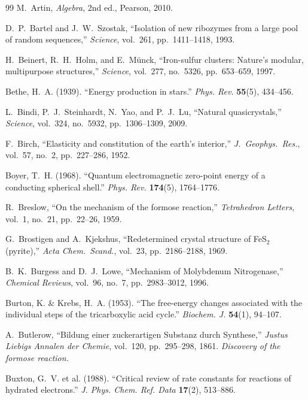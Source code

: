 \documentclass[12pt,oneside]{book}
\begin{document}
\vspace{2em}
\begin{thebibliography}{99}
M.~Artin,
\emph{Algebra},
2nd ed., Pearson, 2010.

D.~P.~Bartel and J.~W.~Szostak,
``Isolation of new ribozymes from a large pool of random sequences,''
\emph{Science}, vol.~261, pp.~1411--1418, 1993.

H.~Beinert, R.~H.~Holm, and E.~M\"unck,
``Iron-sulfur clusters: Nature's modular, multipurpose structures,''
\emph{Science}, vol.~277, no.~5326, pp.~653--659, 1997.

Bethe, H.~A. (1939).
``Energy production in stars.''
\textit{Phys. Rev.} \textbf{55}(5), 434--456.

L.~Bindi, P.~J.~Steinhardt, N.~Yao, and P.~J.~Lu,
``Natural quasicrystals,''
\emph{Science}, vol.~324, no.~5932, pp.~1306--1309, 2009.

F.~Birch,
``Elasticity and constitution of the earth's interior,''
\emph{J.\ Geophys.\ Res.}, vol.~57, no.~2, pp.~227--286, 1952.

Boyer, T.~H. (1968).
``Quantum electromagnetic zero-point energy of a conducting spherical shell.''
\textit{Phys. Rev.} \textbf{174}(5), 1764--1776.

R.~Breslow,
``On the mechanism of the formose reaction,''
\emph{Tetrahedron Letters}, vol.~1, no.~21, pp.~22--26, 1959.

G.~Brostigen and A.~Kjekshus,
``Redetermined crystal structure of FeS$_2$ (pyrite),''
\emph{Acta Chem.\ Scand.}, vol.~23, pp.~2186--2188, 1969.

B.~K.~Burgess and D.~J.~Lowe,
``Mechanism of Molybdenum Nitrogenase,''
\emph{Chemical Reviews}, vol.~96, no.~7, pp.~2983--3012, 1996.

Burton, K. \& Krebs, H.~A. (1953).
``The free-energy changes associated with the individual steps of the tricarboxylic acid cycle.''
\textit{Biochem. J.} \textbf{54}(1), 94--107.

A.~Butlerow,
``Bildung einer zuckerartigen Substanz durch Synthese,''
\emph{Justus Liebigs Annalen der Chemie}, vol.~120, pp.~295--298, 1861.
\textit{Discovery of the formose reaction.}

Buxton, G.~V. et al. (1988).
``Critical review of rate constants for reactions of hydrated electrons.''
\textit{J. Phys. Chem. Ref. Data} \textbf{17}(2), 513--886.


\end{thebibliography}
\end{document}
